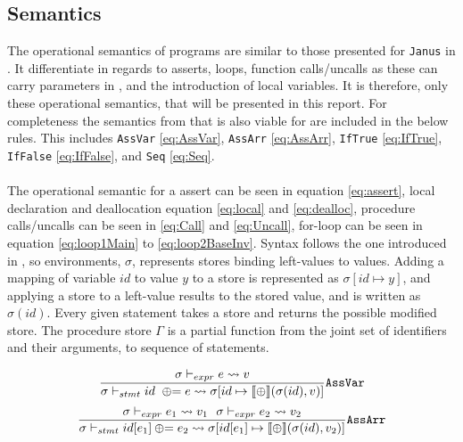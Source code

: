 \subsection{Semantics}
The operational semantics of \lan programs are similar to those presented for \texttt{Janus}
in \cite{janus}. It differentiate in regards to asserts, loops, function calls/uncalls
as these can carry parameters in \lan, and the introduction of local
variables. It is therefore, only these operational semantics, that will be presented in this
report. For completeness the semantics from \cite{janus} that is also viable for \lan are
included in the below rules. This includes \texttt{AssVar} \eqref{eq:AssVar}, \texttt{AssArr}
\eqref{eq:AssArr}, \texttt{IfTrue} \eqref{eq:IfTrue}, \texttt{IfFalse} \eqref{eq:IfFalse},
and \texttt{Seq} \eqref{eq:Seq}.
\\
\\
The operational semantic for a \lan assert can be seen in equation \eqref{eq:assert},
local declaration and deallocation equation \eqref{eq:local} and \eqref{eq:dealloc},
procedure calls/uncalls can be seen in \eqref{eq:Call} and \eqref{eq:Uncall},
for-loop can be seen in equation \eqref{eq:loop1Main} to
\eqref{eq:loop2BaseInv}. Syntax follows the one introduced in \cite{pld}, so
environments, $\sigma$, represents stores binding left-values
to values. Adding a mapping of variable $id$ to value $y$ to a store is represented as
$\sigma[id \mapsto y]$, and applying a store to a left-value results to the stored value,
and is written as $\sigma(id)$. Every given statement takes a store and returns the possible
modified store. The procedure store $\Gamma$ is a partial function from the joint set
of identifiers and their arguments, to sequence of statements.

\begin{multicols}{2}
    \begin{equation} \label{eq:AssVar}
        \frac{\sigma \vdash_{expr} e \leadsto v}
        {\sigma \vdash_{stmt} id~ \oplus{\kern-5.0pt}= e \leadsto
            \sigma[id \mapsto \llbracket \oplus \rrbracket(\sigma(id), v)]}
        \text{\texttt{AssVar}}
    \end{equation}
    \break
    \begin{equation} \label{eq:AssArr}
        \frac{\sigma \vdash_{expr} e_1 \leadsto v_1 ~~
            \sigma \vdash_{expr} e_2 \leadsto v_2}
        {\sigma \vdash_{stmt} id[e_1] \oplus{\kern-5.0pt}= e_2 \leadsto
            \sigma[id[e_1] \mapsto \llbracket\oplus\rrbracket(\sigma(id), v_2)]}
        \text{\texttt{AssArr}}
    \end{equation}
\end{multicols}

